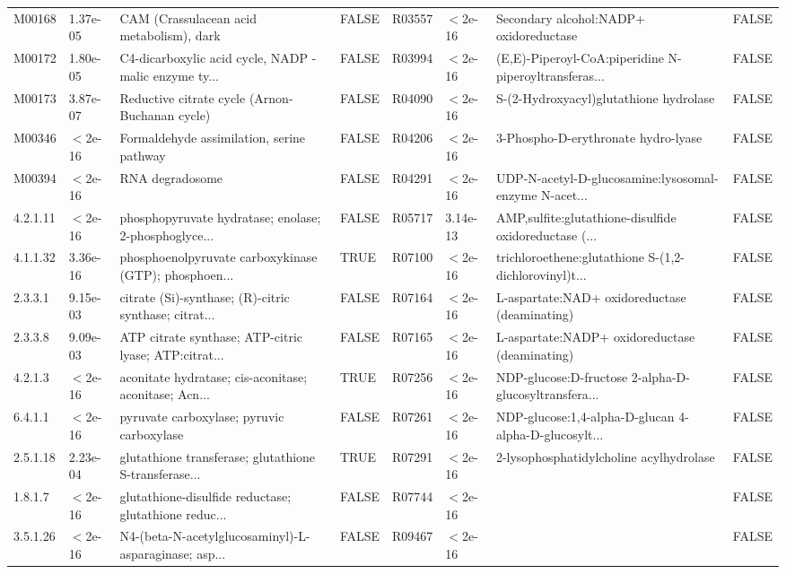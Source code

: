 \documentclass{article}\usepackage[]{graphicx}\usepackage[]{color}
\begin{document}
{{\begin{tabular}{llllllll}
  M00168 &  1.37e-05 & CAM (Crassulacean acid metabolism), dark & FALSE & R03557 & $<$2e-16 & Secondary alcohol:NADP+ oxidoreductase & FALSE \\ 
  M00172 &  1.80e-05 & C4-dicarboxylic acid cycle, NADP - malic enzyme ty... & FALSE & R03994 & $<$2e-16 & (E,E)-Piperoyl-CoA:piperidine N-piperoyltransferas... & FALSE \\ 
  M00173 &  3.87e-07 & Reductive citrate cycle (Arnon-Buchanan cycle) & FALSE & R04090 & $<$2e-16 & S-(2-Hydroxyacyl)glutathione hydrolase & FALSE \\ 
  M00346 & $<$2e-16 & Formaldehyde assimilation, serine pathway & FALSE & R04206 & $<$2e-16 & 3-Phospho-D-erythronate hydro-lyase & FALSE \\ 
  M00394 & $<$2e-16 & RNA degradosome & FALSE & R04291 & $<$2e-16 & UDP-N-acetyl-D-glucosamine:lysosomal-enzyme N-acet... & FALSE \\ 
  4.2.1.11 & $<$2e-16 & phosphopyruvate hydratase; enolase; 2-phosphoglyce... & FALSE & R05717 &  3.14e-13 & AMP,sulfite:glutathione-disulfide oxidoreductase (... & FALSE \\ 
  4.1.1.32 &  3.36e-16 & phosphoenolpyruvate carboxykinase (GTP); phosphoen... & TRUE & R07100 & $<$2e-16 & trichloroethene:glutathione S-(1,2-dichlorovinyl)t... & FALSE \\ 
  2.3.3.1 &  9.15e-03 & citrate (Si)-synthase; (R)-citric synthase; citrat... & FALSE & R07164 & $<$2e-16 & L-aspartate:NAD+ oxidoreductase (deaminating) & FALSE \\ 
  2.3.3.8 &  9.09e-03 & ATP citrate synthase; ATP-citric lyase; ATP:citrat... & FALSE & R07165 & $<$2e-16 & L-aspartate:NADP+ oxidoreductase (deaminating) & FALSE \\ 
  4.2.1.3 & $<$2e-16 & aconitate hydratase; cis-aconitase; aconitase; Acn... & TRUE & R07256 & $<$2e-16 & NDP-glucose:D-fructose 2-alpha-D-glucosyltransfera... & FALSE \\ 
  6.4.1.1 & $<$2e-16 & pyruvate carboxylase; pyruvic carboxylase & FALSE & R07261 & $<$2e-16 & NDP-glucose:1,4-alpha-D-glucan 4-alpha-D-glucosylt... & FALSE \\ 
  2.5.1.18 &  2.23e-04 & glutathione transferase; glutathione S-transferase... & TRUE & R07291 & $<$2e-16 & 2-lysophosphatidylcholine acylhydrolase & FALSE \\ 
  1.8.1.7 & $<$2e-16 & glutathione-disulfide reductase; glutathione reduc... & FALSE & R07744 & $<$2e-16 &  & FALSE \\ 
  3.5.1.26 & $<$2e-16 & N4-(beta-N-acetylglucosaminyl)-L-asparaginase; asp... & FALSE & R09467 & $<$2e-16 &  & FALSE \\ 

\end{tabular}}}
\end{document}
